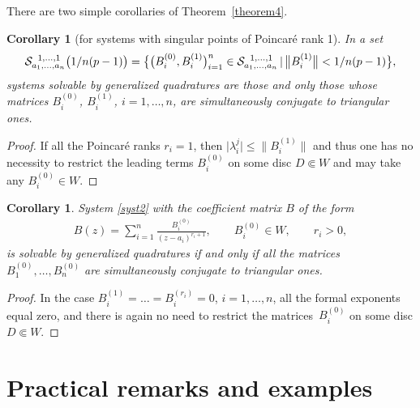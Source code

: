 \documentclass[pdftex]{sigma}
\numberwithin{equation}{section}
\newtheorem{Corollary}[Theorem]{Corollary}
 { \theoremstyle{definition}
\newtheorem{Example}[Theorem]{Example}
\newtheorem{Remark}[Theorem]{Remark} }
\begin{document}
There are two simple corollaries of Theorem~\ref{theorem4}.

\begin{Corollary}[for systems with singular points of Poincar\'e rank 1]
In a set
\begin{gather*}
{\cal S}_{a_1,\ldots,a_n}^{\;\;1,\ldots,1}\bigl(1/n(p-1)\bigr)=\bigl\{ \big(B^{(0)}_i,B^{(1)}_i\big)_{i=1}^n \in
{\cal S}_{a_1,\ldots,a_n}^{\;\;1,\ldots,1} \,|\, \big\|B^{(1)}_i\big\|< 1/n(p-1) \bigr\},
\end{gather*}
systems solvable by generalized quadratures are those and only those whose matrices $B^{(0)}_i$, $B^{(1)}_i$, $i=1,\ldots,n$, are simultaneously conjugate to triangular ones.
\end{Corollary}

\begin{proof} If all the Poincar\'e ranks $r_i=1$, then $\big|\lambda_i^j\big|\leqslant\big\|B^{(1)}_i\big\|$ and thus one has no necessity to restrict the leading terms $B^{(0)}_i$ on some disc $D\Subset W$ and may take any $B^{(0)}_i\in W$.
\end{proof}

\begin{Corollary}\label{corollary2} System \eqref{syst2} with the coefficient matrix $B$ of the form
\begin{gather*}
B(z)=\sum_{i=1}^n\frac{B^{(0)}_i}{(z-a_i)^{r_i+1}}, \qquad B^{(0)}_i\in W, \qquad r_i>0,
\end{gather*}
is solvable by generalized quadratures if and only if all the matrices $B^{(0)}_1,\ldots,B^{(0)}_n$ are simultaneously conjugate to triangular ones.
\end{Corollary}

\begin{proof} In the case $B^{(1)}_i=\dots=B^{(r_i)}_i=0$, $i=1,\ldots,n$, all the formal exponents equal zero, and there is again no need to restrict the matrices~$B^{(0)}_i$ on some disc $D\Subset W$.
\end{proof}

\section{Practical remarks and examples}\label{section4}
\end{document}
